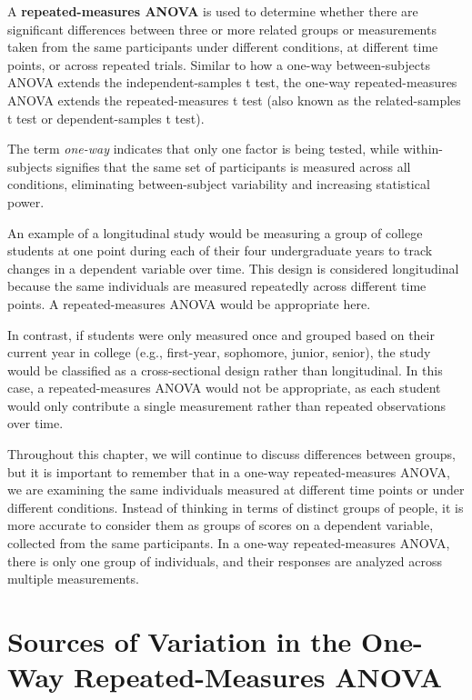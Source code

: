 \documentclass[
  letterpaper,
  DIV=11,
  numbers=noendperiod]{scrreprt}
\begin{document}
A \textbf{repeated-measures ANOVA} is used to determine whether there
are significant differences between three or more related groups or
measurements taken from the same participants under different
conditions, at different time points, or across repeated trials. Similar
to how a one-way between-subjects ANOVA extends the independent-samples
t test, the one-way repeated-measures ANOVA extends the
repeated-measures t test (also known as the related-samples t test or
dependent-samples t test).

The term \emph{one-way} indicates that only one factor is being tested,
while within-subjects signifies that the same set of participants is
measured across all conditions, eliminating between-subject variability
and increasing statistical power.

An example of a longitudinal study would be measuring a group of college
students at one point during each of their four undergraduate years to
track changes in a dependent variable over time. This design is
considered longitudinal because the same individuals are measured
repeatedly across different time points. A repeated-measures ANOVA would
be appropriate here.

In contrast, if students were only measured once and grouped based on
their current year in college (e.g., first-year, sophomore, junior,
senior), the study would be classified as a cross-sectional design
rather than longitudinal. In this case, a repeated-measures ANOVA would
not be appropriate, as each student would only contribute a single
measurement rather than repeated observations over time.

Throughout this chapter, we will continue to discuss differences between
groups, but it is important to remember that in a one-way
repeated-measures ANOVA, we are examining the same individuals measured
at different time points or under different conditions. Instead of
thinking in terms of distinct groups of people, it is more accurate to
consider them as groups of scores on a dependent variable, collected
from the same participants. In a one-way repeated-measures ANOVA, there
is only one group of individuals, and their responses are analyzed
across multiple measurements.

\section{Sources of Variation in the One-Way Repeated-Measures
ANOVA}\label{sources-of-variation-in-the-one-way-repeated-measures-anova}
\end{document}
